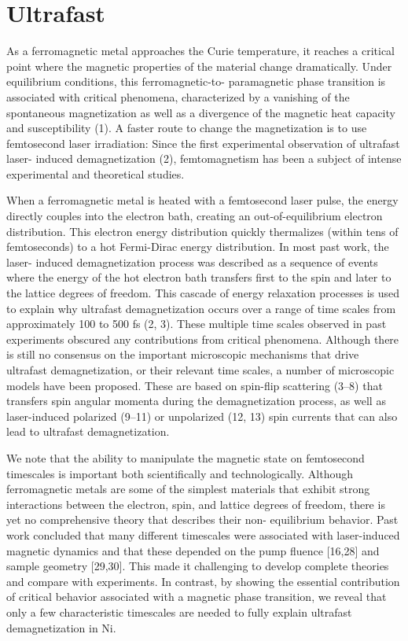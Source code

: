 \begin{equation}

\end{equation}



\section{Ultrafast}
As a ferromagnetic metal approaches the Curie temperature, it reaches a critical point where the magnetic properties of the material change dramatically. Under equilibrium conditions, this ferromagnetic-to- paramagnetic phase transition is associated with critical phenomena, characterized by a vanishing of the spontaneous magnetization as well as a divergence of the magnetic heat capacity and susceptibility (1). A faster route to change the magnetization is to use femtosecond laser irradiation: Since the first experimental observation of ultrafast laser- induced demagnetization (2), femtomagnetism has been a subject of intense experimental and theoretical studies.

When a ferromagnetic metal is heated with a femtosecond laser pulse, the energy directly couples into the electron bath, creating an out-of-equilibrium electron distribution. This electron energy distribution quickly thermalizes (within tens of femtoseconds) to a hot Fermi-Dirac energy distribution. In most past work, the laser- induced demagnetization process was described as a sequence of events where the energy of the hot electron bath transfers first to the spin and later to the lattice degrees of freedom. This cascade of energy relaxation processes is used to explain why ultrafast demagnetization occurs over a range of time scales from approximately 100 to 500 fs (2, 3). These multiple time scales observed in past experiments obscured any contributions from critical phenomena. Although there is still no consensus on the important microscopic mechanisms that drive ultrafast demagnetization, or their relevant time scales, a number of microscopic models have been proposed. These are based on spin-flip scattering (3–8) that transfers spin angular momenta during the demagnetization process, as well as laser-induced polarized (9–11) or unpolarized (12, 13) spin currents that can also lead to ultrafast demagnetization.

We note that the ability to manipulate the magnetic state on femtosecond timescales is important both scientifically and technologically. Although ferromagnetic metals are some of the simplest materials that exhibit strong interactions between the electron, spin, and lattice degrees of freedom, there is yet no comprehensive theory that describes their non- equilibrium behavior. Past work concluded that many different timescales were associated with laser-induced magnetic dynamics and that these depended on the pump fluence [16,28] and sample geometry [29,30]. This made it challenging to develop complete theories and compare with experiments. In contrast, by showing the essential contribution of critical behavior associated with a magnetic phase transition, we reveal that only a few characteristic timescales are needed to fully explain ultrafast demagnetization in Ni.


